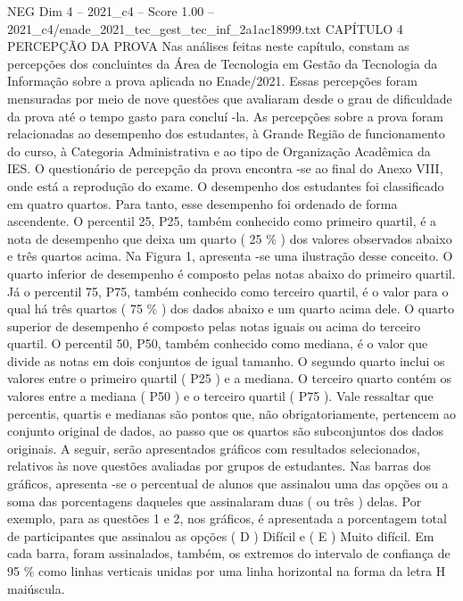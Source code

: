 \begin{textsample}{NEG Dim 4 – 2021\_c4 – Score 1.00 – 2021\_c4/enade\_2021\_tec\_gest\_tec\_inf\_2a1ac18999.txt}  \label{ex:f4_neg_222}
CAPÍTULO 4 PERCEPÇÃO DA PROVA Nas análises feitas neste capítulo, constam as percepções dos concluintes da Área de Tecnologia em Gestão da Tecnologia da Informação sobre a prova aplicada no Enade/2021.
Essas percepções foram mensuradas por meio de nove questões que avaliaram desde o grau de dificuldade da prova até o tempo gasto para concluí -la.
As percepções sobre a prova foram relacionadas ao desempenho dos estudantes, à Grande Região de funcionamento do curso, à Categoria Administrativa e ao tipo de Organização Acadêmica da IES.
O questionário de percepção da prova encontra -se ao final do Anexo VIII, onde está a reprodução do exame.
O desempenho dos estudantes foi classificado em quatro quartos.
Para tanto, esse desempenho foi ordenado de forma ascendente.
O percentil 25, P25, também conhecido como primeiro quartil, é a nota de desempenho que deixa um quarto ( 25 \% ) dos valores observados abaixo e três quartos acima.
Na Figura 1, apresenta -se uma ilustração desse conceito.
O quarto inferior de desempenho é composto pelas notas abaixo do primeiro quartil.
Já o percentil 75, P75, também conhecido como terceiro quartil, é o valor para o qual há três quartos ( 75 \% ) dos dados abaixo e um quarto acima dele.
O quarto superior de desempenho é composto pelas notas iguais ou acima do terceiro quartil.
O percentil 50, P50, também conhecido como mediana, é o valor que divide as notas em dois conjuntos de igual tamanho.
O segundo quarto inclui os valores entre o primeiro quartil ( P25 ) e a mediana.
O terceiro quarto contém os valores entre a mediana ( P50 ) e o terceiro quartil ( P75 ).
Vale ressaltar que percentis, quartis e medianas são pontos que, não obrigatoriamente, pertencem ao conjunto original de dados, ao passo que os quartos são subconjuntos dos dados originais.
A seguir, serão apresentados gráficos com resultados selecionados, relativos às nove questões avaliadas por grupos de estudantes.
Nas barras dos gráficos, apresenta -se o percentual de alunos que assinalou uma das opções ou a soma das porcentagens daqueles que assinalaram duas ( ou três ) delas.
Por exemplo, para as questões 1 e 2, nos gráficos, é apresentada a porcentagem total de participantes que assinalou as opções ( D ) Difícil e ( E ) Muito difícil.
Em cada barra, foram assinalados, também, os extremos do intervalo de confiança de 95 \% como linhas verticais unidas por uma linha horizontal na forma da letra H maiúscula.

\end{textsample}
